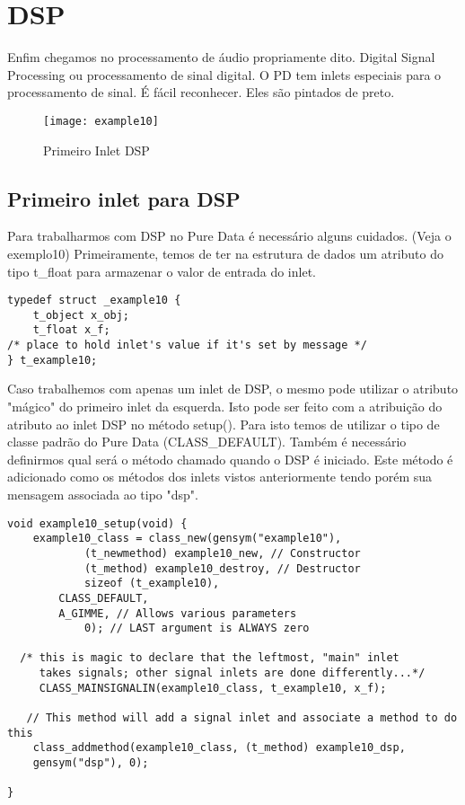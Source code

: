 
\chapter{DSP}

Enfim chegamos no processamento de áudio propriamente dito. Digital Signal Processing ou processamento de sinal digital. O PD tem inlets especiais para o processamento de sinal. É fácil reconhecer. Eles são pintados de preto.
\begin{figure}[h!]
	\centering
	\texttt{[image: example10]}
	\caption{Primeiro Inlet DSP}
\end{figure}

\section{Primeiro inlet para DSP}
Para trabalharmos com DSP no Pure Data é necessário alguns cuidados. (Veja o
exemplo10) Primeiramente, temos de ter na estrutura de dados um atributo do
tipo t\_float para armazenar o valor de entrada do inlet.

\begin{lstlisting}
typedef struct _example10 {
    t_object x_obj;
    t_float x_f;
/* place to hold inlet's value if it's set by message */
} t_example10;
\end{lstlisting}

Caso trabalhemos com apenas um inlet de DSP, o mesmo pode utilizar o atributo
"mágico" do primeiro inlet da esquerda. Isto pode ser feito com a atribuição do
atributo ao inlet DSP no método setup(). Para isto temos de utilizar o tipo de
classe padrão do Pure Data (CLASS\_DEFAULT). Também é necessário definirmos
qual será o método chamado quando o DSP é iniciado. Este método é adicionado
como os métodos dos inlets vistos anteriormente tendo porém sua mensagem
associada ao tipo "dsp".

\begin{lstlisting}
void example10_setup(void) {
    example10_class = class_new(gensym("example10"),
            (t_newmethod) example10_new, // Constructor
            (t_method) example10_destroy, // Destructor
            sizeof (t_example10),
	    CLASS_DEFAULT,
	    A_GIMME, // Allows various parameters
            0); // LAST argument is ALWAYS zero

  /* this is magic to declare that the leftmost, "main" inlet
     takes signals; other signal inlets are done differently...*/
     CLASS_MAINSIGNALIN(example10_class, t_example10, x_f);

   // This method will add a signal inlet and associate a method to do this
    class_addmethod(example10_class, (t_method) example10_dsp, 
	gensym("dsp"), 0); 

}
\end{lstlisting}
 
